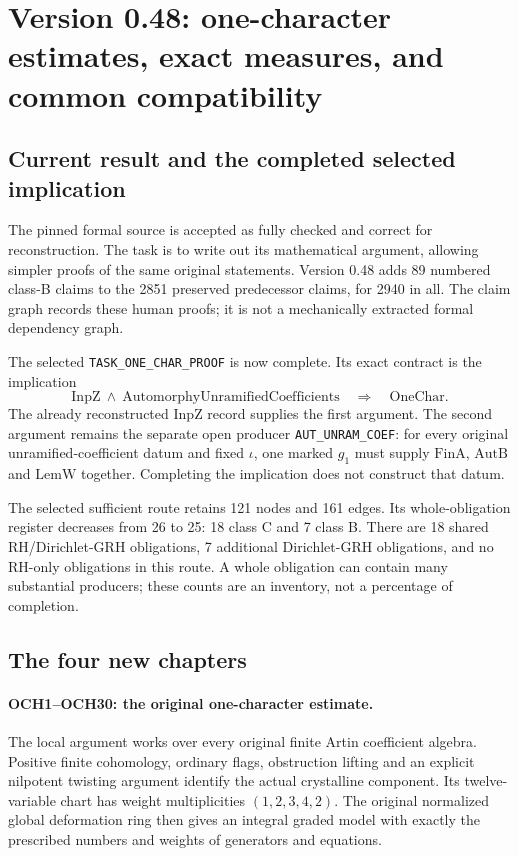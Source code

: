 \section{Version 0.48: one-character estimates, exact measures, and common compatibility}
\label{sec:dependency-audit-v48}

\subsection{Current result and the completed selected implication}

The pinned formal source is accepted as fully checked and correct for
reconstruction. The task is to write out its mathematical argument,
allowing simpler proofs of the same original statements. Version 0.48
adds 89 numbered class-B claims to the 2851 preserved predecessor
claims, for 2940 in all. The claim graph records these human proofs;
it is not a mechanically extracted formal dependency graph.

The selected \texttt{TASK\_\allowbreak ONE\_\allowbreak CHAR\_\allowbreak PROOF} is now complete.
Its exact contract is the implication
\[
 \mathrm{InpZ}\ \wedge\
 \mathrm{AutomorphyUnramifiedCoefficients}
 \quad\Longrightarrow\quad\mathrm{OneChar}.
\]
The already reconstructed \(\mathrm{InpZ}\) record supplies the first
argument. The second argument remains the separate open producer
\texttt{AUT\_\allowbreak UNRAM\_\allowbreak COEF}: for every original unramified-coefficient
datum and fixed \(\iota\), one marked \(g_1\) must supply
\(\mathrm{FinA}\), \(\mathrm{AutB}\) and \(\mathrm{LemW}\)
together. Completing the implication does not construct that datum.

The selected sufficient route retains 121 nodes and 161 edges.
Its whole-obligation register decreases from 26 to 25:
18 class C and 7 class B. There are 18 shared RH/Dirichlet-GRH
obligations, 7 additional Dirichlet-GRH obligations, and no
RH-only obligations in this route. A whole obligation can contain
many substantial producers; these counts are an inventory, not a
percentage of completion.

\subsection{The four new chapters}

\paragraph{OCH1--OCH30: the original one-character estimate.}
The local argument works over every original finite Artin coefficient
algebra. Positive finite cohomology, ordinary flags, obstruction
lifting and an explicit nilpotent twisting argument identify the
actual crystalline component. Its twelve-variable chart has weight
multiplicities \((1,2,3,4,2)\). The original normalized global
deformation ring then gives an integral graded model with exactly
the prescribed numbers and weights of generators and equations.

